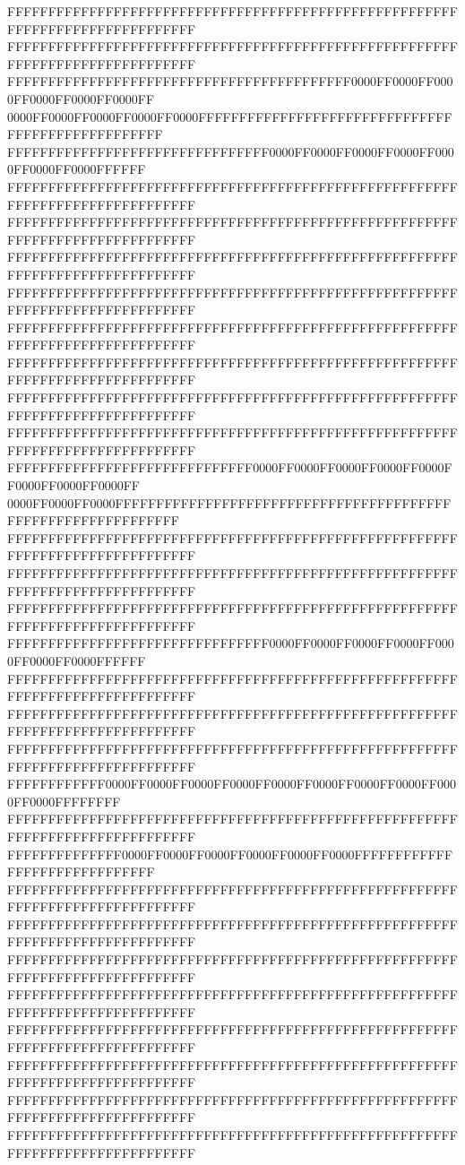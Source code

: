 FFFFFFFFFFFFFFFFFFFFFFFFFFFFFFFFFFFFFFFFFFFFFFFFFFFFFFFFFFFFFFFFFFFFFFFFFFFFFF
FFFFFFFFFFFFFFFFFFFFFFFFFFFFFFFFFFFFFFFFFFFFFFFFFFFFFFFFFFFFFFFFFFFFFFFFFFFFFF
FFFFFFFFFFFFFFFFFFFFFFFFFFFFFFFFFFFFFFFFFF0000FF0000FF0000FF0000FF0000FF0000FF
0000FF0000FF0000FF0000FF0000FFFFFFFFFFFFFFFFFFFFFFFFFFFFFFFFFFFFFFFFFFFFFFFFFF
FFFFFFFFFFFFFFFFFFFFFFFFFFFFFFFF0000FF0000FF0000FF0000FF0000FF0000FF0000FFFFFF
FFFFFFFFFFFFFFFFFFFFFFFFFFFFFFFFFFFFFFFFFFFFFFFFFFFFFFFFFFFFFFFFFFFFFFFFFFFFFF
FFFFFFFFFFFFFFFFFFFFFFFFFFFFFFFFFFFFFFFFFFFFFFFFFFFFFFFFFFFFFFFFFFFFFFFFFFFFFF
FFFFFFFFFFFFFFFFFFFFFFFFFFFFFFFFFFFFFFFFFFFFFFFFFFFFFFFFFFFFFFFFFFFFFFFFFFFFFF
FFFFFFFFFFFFFFFFFFFFFFFFFFFFFFFFFFFFFFFFFFFFFFFFFFFFFFFFFFFFFFFFFFFFFFFFFFFFFF
FFFFFFFFFFFFFFFFFFFFFFFFFFFFFFFFFFFFFFFFFFFFFFFFFFFFFFFFFFFFFFFFFFFFFFFFFFFFFF
FFFFFFFFFFFFFFFFFFFFFFFFFFFFFFFFFFFFFFFFFFFFFFFFFFFFFFFFFFFFFFFFFFFFFFFFFFFFFF
FFFFFFFFFFFFFFFFFFFFFFFFFFFFFFFFFFFFFFFFFFFFFFFFFFFFFFFFFFFFFFFFFFFFFFFFFFFFFF
FFFFFFFFFFFFFFFFFFFFFFFFFFFFFFFFFFFFFFFFFFFFFFFFFFFFFFFFFFFFFFFFFFFFFFFFFFFFFF
FFFFFFFFFFFFFFFFFFFFFFFFFFFFFF0000FF0000FF0000FF0000FF0000FF0000FF0000FF0000FF
0000FF0000FF0000FFFFFFFFFFFFFFFFFFFFFFFFFFFFFFFFFFFFFFFFFFFFFFFFFFFFFFFFFFFFFF
FFFFFFFFFFFFFFFFFFFFFFFFFFFFFFFFFFFFFFFFFFFFFFFFFFFFFFFFFFFFFFFFFFFFFFFFFFFFFF
FFFFFFFFFFFFFFFFFFFFFFFFFFFFFFFFFFFFFFFFFFFFFFFFFFFFFFFFFFFFFFFFFFFFFFFFFFFFFF
FFFFFFFFFFFFFFFFFFFFFFFFFFFFFFFFFFFFFFFFFFFFFFFFFFFFFFFFFFFFFFFFFFFFFFFFFFFFFF
FFFFFFFFFFFFFFFFFFFFFFFFFFFFFFFF0000FF0000FF0000FF0000FF0000FF0000FF0000FFFFFF
FFFFFFFFFFFFFFFFFFFFFFFFFFFFFFFFFFFFFFFFFFFFFFFFFFFFFFFFFFFFFFFFFFFFFFFFFFFFFF
FFFFFFFFFFFFFFFFFFFFFFFFFFFFFFFFFFFFFFFFFFFFFFFFFFFFFFFFFFFFFFFFFFFFFFFFFFFFFF
FFFFFFFFFFFFFFFFFFFFFFFFFFFFFFFFFFFFFFFFFFFFFFFFFFFFFFFFFFFFFFFFFFFFFFFFFFFFFF
FFFFFFFFFFFF0000FF0000FF0000FF0000FF0000FF0000FF0000FF0000FF0000FF0000FFFFFFFF
FFFFFFFFFFFFFFFFFFFFFFFFFFFFFFFFFFFFFFFFFFFFFFFFFFFFFFFFFFFFFFFFFFFFFFFFFFFFFF
FFFFFFFFFFFFFF0000FF0000FF0000FF0000FF0000FF0000FFFFFFFFFFFFFFFFFFFFFFFFFFFFFF
FFFFFFFFFFFFFFFFFFFFFFFFFFFFFFFFFFFFFFFFFFFFFFFFFFFFFFFFFFFFFFFFFFFFFFFFFFFFFF
FFFFFFFFFFFFFFFFFFFFFFFFFFFFFFFFFFFFFFFFFFFFFFFFFFFFFFFFFFFFFFFFFFFFFFFFFFFFFF
FFFFFFFFFFFFFFFFFFFFFFFFFFFFFFFFFFFFFFFFFFFFFFFFFFFFFFFFFFFFFFFFFFFFFFFFFFFFFF
FFFFFFFFFFFFFFFFFFFFFFFFFFFFFFFFFFFFFFFFFFFFFFFFFFFFFFFFFFFFFFFFFFFFFFFFFFFFFF
FFFFFFFFFFFFFFFFFFFFFFFFFFFFFFFFFFFFFFFFFFFFFFFFFFFFFFFFFFFFFFFFFFFFFFFFFFFFFF
FFFFFFFFFFFFFFFFFFFFFFFFFFFFFFFFFFFFFFFFFFFFFFFFFFFFFFFFFFFFFFFFFFFFFFFFFFFFFF
FFFFFFFFFFFFFFFFFFFFFFFFFFFFFFFFFFFFFFFFFFFFFFFFFFFFFFFFFFFFFFFFFFFFFFFFFFFFFF
FFFFFFFFFFFFFFFFFFFFFFFFFFFFFFFFFFFFFFFFFFFFFFFFFFFFFFFFFFFFFFFFFFFFFFFFFFFFFF
